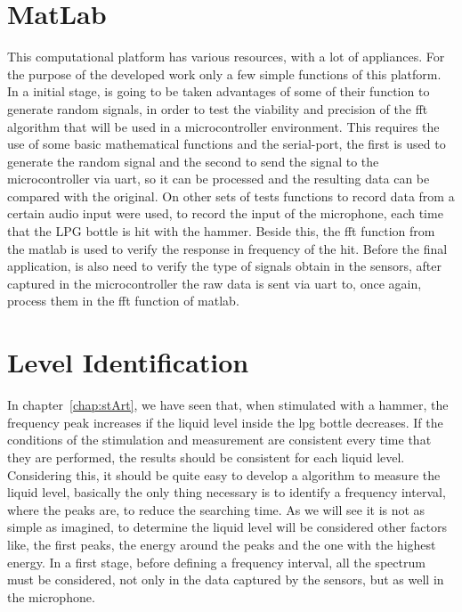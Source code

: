 \section{MatLab}
This computational platform has various resources, with a lot of appliances. For the purpose of the developed work only a few simple functions of this platform. In a initial stage, is going to be taken advantages of some of their function to generate random signals, in order to test the viability and precision of the \acrshort{fft} algorithm that will be used in a microcontroller environment. This requires the use of some basic mathematical functions and the serial-port, the first is used to generate the random signal and the second to send the signal to the microcontroller via \acrshort{uart}, so it can be processed and the resulting data can be compared with the original.
On other sets of tests functions to record data from a certain audio input were used, to record the input of the microphone, each time that the LPG bottle is hit with the hammer. Beside this, the \acrshort{fft} function from the \acrshort{matlab} is used to verify the response in frequency of the hit.
Before the final application, is also need to verify the type of signals obtain in the sensors, after captured in the microcontroller the raw data is sent via \acrshort{uart} to, once again, process them in the \acrshort{fft} function of \acrshort{matlab}.

\section{Level Identification}
In chapter~\ref{chap:stArt}, we have seen that, when stimulated with a hammer, the frequency peak increases if the liquid level inside the \acrshort{lpg} bottle decreases. If the conditions of the stimulation and measurement are consistent every time that they are performed, the results should be consistent for each liquid level. Considering this, it should be quite easy to develop a algorithm to measure the liquid level, basically the only thing necessary is to identify a frequency interval, where the peaks are, to reduce the searching time. As we will see it is not as simple as imagined, to determine the liquid level will be considered other factors like, the first peaks, the energy around the peaks and the one with the highest energy. In a first stage, before defining a frequency interval, all the spectrum must be considered, not only in the data captured by the sensors, but as well in the microphone.

